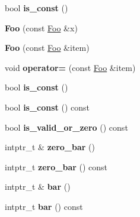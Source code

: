 \begin{DoxyCompactItemize}
\item 
\hypertarget{structFoo_a2c236bbbc4f98ff079f595200e1cf393}{}bool {\bfseries is\+\_\+const} ()\label{structFoo_a2c236bbbc4f98ff079f595200e1cf393}

\item 
\hypertarget{structFoo_a4160d6a0973f3fb9a8f0e50dbb27b53f}{}{\bfseries Foo} (const \hyperlink{structFoo}{Foo} \&x)\label{structFoo_a4160d6a0973f3fb9a8f0e50dbb27b53f}

\item 
\hypertarget{structFoo_ad3fe1b6da38a19837b3680e0972f7522}{}{\bfseries Foo} (const \hyperlink{structFoo}{Foo} \&item)\label{structFoo_ad3fe1b6da38a19837b3680e0972f7522}

\item 
\hypertarget{structFoo_a00850855fe7d449afcd9832c634dfa2d}{}void {\bfseries operator=} (const \hyperlink{structFoo}{Foo} \&item)\label{structFoo_a00850855fe7d449afcd9832c634dfa2d}

\item 
\hypertarget{structFoo_a2c236bbbc4f98ff079f595200e1cf393}{}bool {\bfseries is\+\_\+const} ()\label{structFoo_a2c236bbbc4f98ff079f595200e1cf393}

\item 
\hypertarget{structFoo_a6188c776a5d2f1f37a72485f948c2491}{}bool {\bfseries is\+\_\+const} () const \label{structFoo_a6188c776a5d2f1f37a72485f948c2491}

\item 
\hypertarget{structFoo_ae0442ac827c6b6f8f75ef2d26af568f4}{}bool {\bfseries is\+\_\+valid\+\_\+or\+\_\+zero} () const \label{structFoo_ae0442ac827c6b6f8f75ef2d26af568f4}

\item 
\hypertarget{structFoo_a2ada60005ec279fa7e1bad626af5a5a3}{}intptr\+\_\+t \& {\bfseries zero\+\_\+bar} ()\label{structFoo_a2ada60005ec279fa7e1bad626af5a5a3}

\item 
\hypertarget{structFoo_ab69471b7382ce912d9116269b11aa0f4}{}intptr\+\_\+t {\bfseries zero\+\_\+bar} () const \label{structFoo_ab69471b7382ce912d9116269b11aa0f4}

\item 
\hypertarget{structFoo_ab856674c06399beda9136cc01149dd45}{}intptr\+\_\+t \& {\bfseries bar} ()\label{structFoo_ab856674c06399beda9136cc01149dd45}

\item 
\hypertarget{structFoo_a9536b59870a51eff05b190108da6b285}{}intptr\+\_\+t {\bfseries bar} () const \label{structFoo_a9536b59870a51eff05b190108da6b285}


\end{DoxyCompactItemize}
